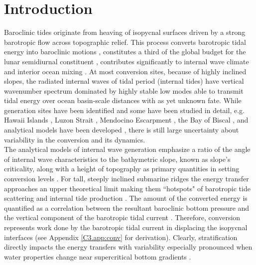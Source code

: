 \documentclass[12pt]{article}
\begin{document}
\section{Introduction}
Baroclinic tides originate from heaving of isopycnal surfaces driven by a strong 
barotropic flow across topographic relief. This process converts barotropic tidal 
energy into baroclinic motions \citep{hendershott1981long}, constitutes a 
third of the global budget for the lunar semidiurnal constituent \citep{egbert2000significant, 
munk1997once}, contributes significantly to internal wave climate \citep{wunsch1975deep} and 
interior ocean mixing \citep{wunsch2004vertical}. At most conversion sites, because of highly 
inclined slopes, the radiated 
internal waves of tidal period (internal tides) have vertical wavenumber spectrum dominated by 
highly stable low modes \citep{st2002role} able to transmit tidal energy over ocean basin-scale 
distances \citep{zhao2016global} with as yet unknown fate. While generation sites have been 
identified 
\citep{morozov1995semidiurnal, simmons2004internal, arbic2010concurrent} and some have been 
studied in detail, e.g. Hawaii Islands \citep{rudnick2003tides}, Luzon Strait 
\citep{alford2015formation}, Mendocino Escarpment \citep{althaus2003internal}, 
the Bay of Biscal 
\citep{gerkema2004internal}, and analytical models have been developed \citep{garrett2007internal}, 
there is still large uncertainty about variability in the conversion and its dynamics.\\

The analytical models of internal wave generation emphasize a ratio of the angle of internal wave 
characteristics to the bathymetric slope, known as slope's criticality, 
\citep{sutherland2010internal, 
garrett2007internal} along with a height of topography as primary quantities in setting conversion 
levels \citep{llewellyn2003tidal, petrelis2006tidal}. For tall, steeply inclined submarine ridges 
the energy transfer approaches an upper theoretical limit \citep{petrelis2006tidal, 
st2003generation} making them ``hotspots" of barotropic tide scattering and internal tide 
production \citep{morozov1995semidiurnal, egbert2000significant}. The amount of the converted 
energy is 
quantified as a correlation between the resultant baroclinic bottom pressure and the 
vertical component of the barotropic tidal current \citep{kurapov2003m, simmons2004internal}. 
Therefore, conversion  
represents work done by the 
barotropic tidal current in displacing the isopycnal interfaces (see Appendix \ref{C3.app:conv} for 
derivation). Clearly, stratification  
directly 
impacts the energy transfers \citep{holloway1999internal} with variability especially 
pronounced when water properties change near supercritical bottom gradients 
\citep{gerkema2004internal}.\\
\end{document}
